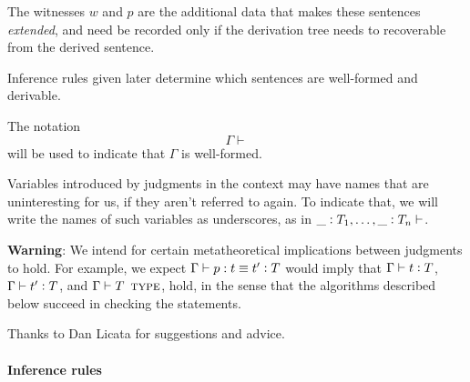 \documentclass[11pt]{article}
\newcommand{\eqd}{\equiv}
\newcommand{\ccolon}[1]{\vcentcolon#1}
\newcommand{\ccheck}[1]{\vcentcolon#1}  %
\newcommand{\synth}[1]{\vcentcolon(\Rightarrow#1)} %
\renewcommand{\synth}[1]{\ccheck#1} %
\newcommand{\Type}{\mathop{\text{ \sc type}}}
\newcommand{\Okay}{\mathop{\text{ \sc okay}}}
\newcommand{\Context}{\vdash\Okay}
\renewcommand{\Context}{\vdash}
\newcommand{\var}{\char`_}
\begin{document}
The witnesses $w$ and $p$ are the additional data that makes these sentences
{\em extended}, and need be recorded only if the derivation tree needs to
recoverable from the derived sentence.

Inference rules given later determine which sentences are well-formed and
derivable.

The notation $$\Gamma \Context$$ will be used to indicate that $\Gamma$ is
well-formed.

Variables introduced by judgments in the context may have names that are
uninteresting for us, if they aren't referred to again.  To indicate that, we
will write the names of such variables as underscores, as in $\var
\ccolon{T_1},\dots,\var \ccolon{T_n}\Context$.


{\bf Warning}: We intend for certain metatheoretical implications between
judgments to hold.  For example, we expect $\Gamma \vdash p : t \eqd t'
\synth{T}$ would imply that $\Gamma \vdash t \synth{T}$, $\Gamma \vdash t'
\synth{T}$, and $\Gamma \vdash T \Type$, hold, in the sense that the algorithms
described below succeed in checking the statements.

Thanks to Dan Licata for suggestions and advice.

\paragraph{Inference rules} 
\end{document}
